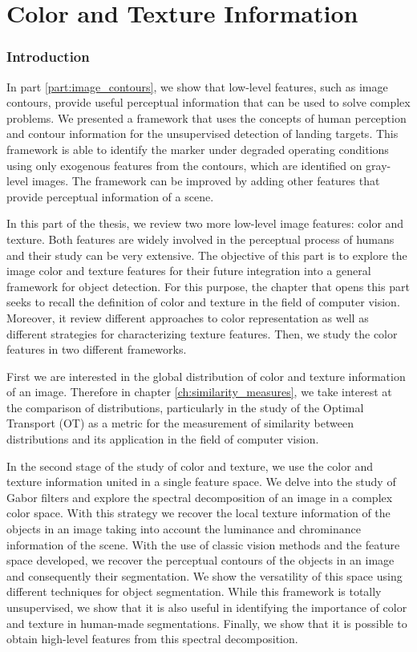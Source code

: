 \part{Color and Texture Information}\label{part:color_texture}%

\section*{Introduction}
In part \ref{part:image_contours}, we show that low-level features, such as image contours, provide useful perceptual information that can be used to solve complex problems. We presented a framework that uses the concepts of human perception and contour information for the unsupervised detection of landing targets. This framework is able to identify the marker under degraded operating conditions using only exogenous features from the contours, which are identified on gray-level images. The framework can be improved by adding other features that provide perceptual information of a scene.

In this part of the thesis, we review two more low-level image features: color and texture. Both features are widely involved in the perceptual process of humans and their study can be very extensive. The objective of this part is to explore the image color and texture features for their future integration into a general framework for object detection. For this purpose, the chapter that opens this part seeks to recall the definition of color and texture in the field of computer vision. Moreover, it review different approaches to color representation as well as different strategies for characterizing texture features. Then, we study the color features in two different frameworks. 

First we are interested in the global distribution of color and texture information of an image. Therefore in chapter \ref{ch:similarity_measures}, we take interest at the comparison of distributions, particularly in the study of the Optimal Transport (OT) as a metric for the measurement of similarity between distributions and its application in the field of computer vision. 

In the second stage of the study of color and texture, we use the color and texture information united in a single feature space. We delve into the study of Gabor filters and explore the spectral decomposition of an image in a complex color space. With this strategy we recover the local texture information of the objects in an image taking into account the luminance and chrominance information of the scene. With the use of classic vision methods and the feature space developed, we recover the perceptual contours of the objects in an image and consequently their segmentation. We show the versatility of this space using different techniques for object segmentation. While this framework is totally unsupervised, we show that it is also useful in identifying the importance of color and texture in human-made segmentations. Finally, we show that it is possible to obtain high-level features from this spectral decomposition.

